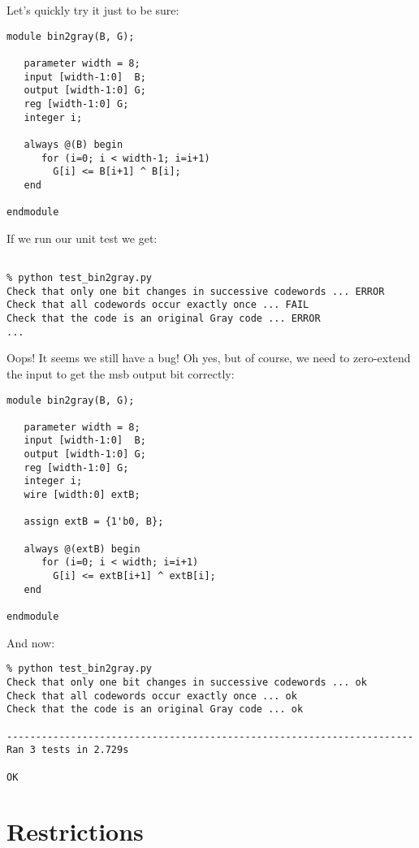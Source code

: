 Let's quickly try it just to be sure:

\begin{verbatim}
module bin2gray(B, G);

   parameter width = 8;
   input [width-1:0]  B;
   output [width-1:0] G;
   reg [width-1:0] G;
   integer i;

   always @(B) begin
      for (i=0; i < width-1; i=i+1)
        G[i] <= B[i+1] ^ B[i];
   end

endmodule

\end{verbatim}

If we run our unit test we get:

\begin{verbatim}

% python test_bin2gray.py   
Check that only one bit changes in successive codewords ... ERROR
Check that all codewords occur exactly once ... FAIL
Check that the code is an original Gray code ... ERROR
...

\end{verbatim}

Oops! It seems we still have a bug! Oh yes, but of course, 
we need to zero-extend the input to get the msb output bit
correctly:

\begin{verbatim}
module bin2gray(B, G);

   parameter width = 8;
   input [width-1:0]  B;
   output [width-1:0] G;
   reg [width-1:0] G;
   integer i;
   wire [width:0] extB;

   assign extB = {1'b0, B};

   always @(extB) begin
      for (i=0; i < width; i=i+1)
        G[i] <= extB[i+1] ^ extB[i];
   end

endmodule

\end{verbatim}

And now:

\begin{verbatim}
% python test_bin2gray.py 
Check that only one bit changes in successive codewords ... ok
Check that all codewords occur exactly once ... ok
Check that the code is an original Gray code ... ok

----------------------------------------------------------------------
Ran 3 tests in 2.729s

OK

\end{verbatim}


\section{Restrictions}

